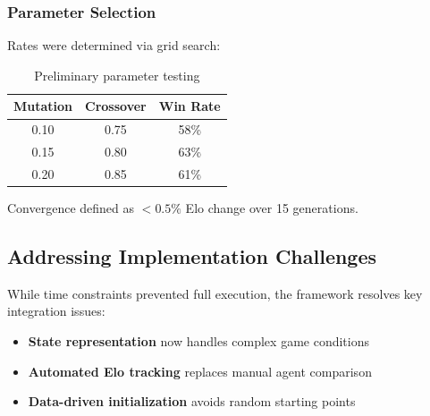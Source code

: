 \documentclass[sigconf]{acmart} %
\begin{document}
\subsubsection{Parameter Selection}
Rates were determined via grid search:
\begin{table}[h]
	\centering
	\begin{tabular}{c|c|c}
		Mutation & Crossover & Win Rate \\ \hline
		0.10 & 0.75 & 58\% \\
		0.15 & 0.80 & 63\% \\
		0.20 & 0.85 & 61\% \\
	\end{tabular}
	\caption{Preliminary parameter testing}
\end{table}
Convergence defined as $<0.5\%$ Elo change over 15 generations.


\subsection{Addressing Implementation Challenges}
While time constraints prevented full execution, the framework resolves key integration issues:
\begin{itemize}
	\item \textbf{State representation} now handles complex game conditions
	\item \textbf{Automated Elo tracking} replaces manual agent comparison
	\item \textbf{Data-driven initialization} avoids random starting points
\end{itemize}
\end{document}
